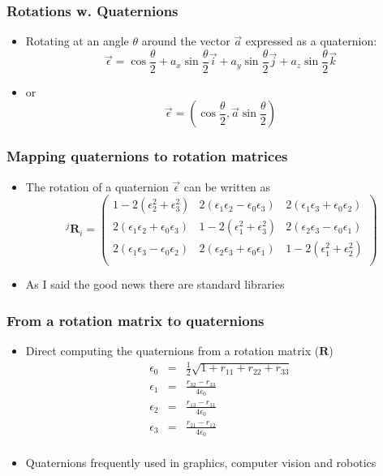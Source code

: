 \documentclass[10pt]{beamer}
\begin{document}
\begin{frame}
  \frametitle{Rotations w. Quaternions}
  \begin{itemize}
  \item Rotating at an angle $\theta$ around the vector $\vec{a}$ expressed as a quaternion:
    \[
      \vec{\epsilon} = \cos \frac{\theta}{2} + a_x \sin \frac{\theta}{2} \vec{i}
      + a_y \sin \frac{\theta}{2} \vec{j} + a_z \sin \frac{\theta}{2} \vec{k}
    \]    
  \item or
    \[
      \vec{\epsilon} = ( \cos \frac{\theta}{2}, \vec{a} \sin \frac{\theta}{2} )
    \]
  \end{itemize}
\end{frame}

\begin{frame}
  \frametitle{Mapping quaternions to rotation matrices}
  \begin{itemize}
  \item The rotation of a quaternion $\vec{\epsilon}$ can be written as
    \[
      ~^{j}\mathbf{R}_i = \left(
        \begin{array}{ccc}
          1 - 2( \epsilon_2^2 + \epsilon_3^2) & 2 ( \epsilon_1 \epsilon_2 - \epsilon_0 \epsilon_3 ) & 2 ( \epsilon_1 \epsilon_3 + \epsilon_0 \epsilon_2 ) \\
          2 ( \epsilon_1 \epsilon_2 + \epsilon_0 \epsilon_3  ) & 1 - 2 (\epsilon_1^2 + \epsilon_3^2) & 2 ( \epsilon_2 \epsilon_3 - \epsilon_0 \epsilon_1 ) \\
          2 ( \epsilon_1 \epsilon_3 - \epsilon_0 \epsilon_2 ) & 2 ( \epsilon_2 \epsilon_3 + \epsilon_0 \epsilon_1 ) & 1 - 2 (\epsilon_1^2 + \epsilon_2^2) \\
        \end{array} \right)
    \]
  \item As I said the good news there are standard libraries
  \end{itemize}
\end{frame}

\begin{frame}
  \frametitle{From a rotation matrix to quaternions}
  \begin{itemize}
  \item Direct computing the quaternions from a rotation matrix ($\mathbf{R}$)
    \[
      \begin{array}{ccc}
        \epsilon_0 & = & \frac{1}{2} \sqrt{ 1 + r_{11} + r_{22} + r_{33} }\\
        \epsilon_1 & = & \frac{r_{32} - r_{33}}{4 \epsilon_0}\\
        \epsilon_2 & = & \frac{r_{13} - r_{31}}{4 \epsilon_0}\\
        \epsilon_3 & = & \frac{r_{21} - r_{12}}{4 \epsilon_0}\\        
      \end{array}
    \]
  \item Quaternions frequently used in graphics, computer vision and robotics
  \end{itemize}
\end{frame}
\end{document}
